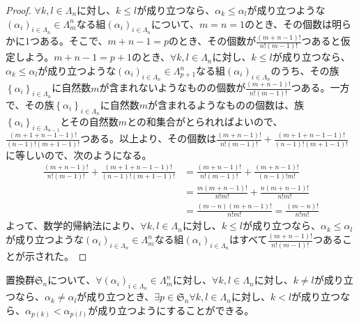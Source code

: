 \documentclass[dvipdfmx]{jsarticle}
\begin{document}
\begin{proof}
$\forall k,l \in \varLambda_{n}$に対し、$k \leq l$が成り立つなら、$\alpha_{k} \leq \alpha_{l}$が成り立つような$\left( \alpha_{i} \right)_{i \in \varLambda_{n}} \in \varLambda_{m}^{n}$なる組$\left( \alpha_{i} \right)_{i \in \varLambda_{n}}$について、$m = n = 1$のとき、その個数は明らかに$1$つある。そこで、$m + n - 1 = p$のとき、その個数が$\frac{(m + n - 1)!}{n!(m - 1)!}$つあると仮定しよう。$m + n - 1 = p + 1$のとき、$\forall k,l \in \varLambda_{n}$に対し、$k \leq l$が成り立つなら、$\alpha_{k} \leq \alpha_{l}$が成り立つような$\left( \alpha_{i} \right)_{i \in \varLambda_{n}} \in \varLambda_{p + 1}^{n}$なる組$\left( \alpha_{i} \right)_{i \in \varLambda_{n}}$のうち、その族$\left\{ \alpha_{i} \right\}_{i \in \varLambda_{n}}$に自然数$m$が含まれないようなものの個数が$\frac{(m + n - 1)!}{n!(m - 1)!}$つある。一方で、その族$\left\{ \alpha_{i} \right\}_{i \in \varLambda_{n}}$に自然数$m$が含まれるようなものの個数は、族$\left\{ \alpha_{i} \right\}_{i \in \varLambda_{n - 1}}$とその自然数$m$との和集合がとられればよいので、$\frac{(m + 1 + n - 1 - 1)!}{(n - 1)!(m + 1 - 1)!}$つある。以上より、その個数は$\frac{(m + n - 1)!}{n!(m - 1)!} + \frac{(m + 1 + n - 1 - 1)!}{(n - 1)!(m + 1 - 1)!}$に等しいので、次のようになる。
\begin{align*}
\frac{(m + n - 1)!}{n!(m - 1)!} + \frac{(m + 1 + n - 1 - 1)!}{(n - 1)!(m + 1 - 1)!} &= \frac{(m + n - 1)!}{n!(m - 1)!} + \frac{(m + n - 1)!}{(n - 1)!m!}\\
&= \frac{m(m + n - 1)!}{n!m!} + \frac{n(m + n - 1)!}{n!m!}\\
&= \frac{(m - n)(m + n - 1)!}{n!m!} = \frac{(m - n)!}{n!m!}
\end{align*}
よって、数学的帰納法により、$\forall k,l \in \varLambda_{n}$に対し、$k \leq l$が成り立つなら、$\alpha_{k} \leq \alpha_{l}$が成り立つような$\left( \alpha_{i} \right)_{i \in \varLambda_{n}} \in \varLambda_{m}^{n}$なる組$\left( \alpha_{i} \right)_{i \in \varLambda_{n}}$はすべて$\frac{(m + n - 1)!}{n!(m - 1)!}$つあることが示された。
\end{proof}
\begin{thm}\label{2.1.10.11}
置換群$\mathfrak{S}_{n}$について、$\forall\left( \alpha_{i} \right)_{i \in \varLambda_{n}} \in \varLambda_{m}^{n}$に対し、$\forall k,l \in \varLambda_{n}$に対し、$k \neq l$が成り立つなら、$\alpha_{k} \neq \alpha_{l}$が成り立つとき、$\exists p \in \mathfrak{S}_{n}\forall k,l \in \varLambda_{n}$に対し、$k < l$が成り立つなら、$\alpha_{p(k)} < \alpha_{p(l)}$が成り立つようにすることができる。
\end{thm}
\end{document}
